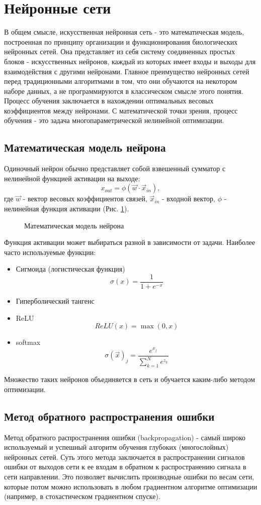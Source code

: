 \clearpage
\section{Нейронные сети}
	В общем смысле, искусственная нейронная сеть - это математическая модель, построенная по принципу организации и функционирования биологических нейронных сетей. Она представляет из себя систему соединенных простых блоков - искусственных нейронов, каждый из которых имеет входы и выходы для взаимодействия с другими нейронами. Главное преимущество нейронных сетей перед традиционными алгоритмами в том, что они обучаются на некотором наборе данных, а не программируются в классическом смысле этого понятия. Процесс обучения заключается в нахождении оптимальных весовых коэффициентов между нейронами. С математической точки зрения, процесс обучения - это задача многопараметрической нелинейной оптимизации.
	\subsection{Математическая модель нейрона}
		Одиночный нейрон обычно представляет собой взвешенный сумматор с нелинейной функцией активации на выходе:
		$$x_{out} = \phi(\vec{w} \cdotp \vec{x}_{in}),$$
		где $\vec{w}$ - вектор весовых коэффициентов связей, $\vec{x}_{in}$ - входной вектор, $\phi$ - нелинейная функция активации (Рис. \ref{3-artificial-neuron-model}).
		
		\begin{figure}[h]
			\caption{Математическая модель нейрона}
			\label{3-artificial-neuron-model}
		\end{figure}
		
		Функция активации может выбираться разной в зависимости от задачи. Наиболее часто используемые функции:
		
		\begin{itemize}
			\item Сигмоида (логистическая функция)
					$$\sigma(x) = \frac{1}{1 + e^{-x}}$$
			\item Гиперболический тангенс
			\item ReLU
					$$ReLU(x) = \max(0, x)$$
			\item softmax
					$$\sigma(\vec{x})_j = \frac{e^{x_j}}{\sum_{k=1}^{N} e^{z_k}}$$
		\end{itemize}
		Множество таких нейронов объединяется в сеть и обучается каким-либо методом оптимизации.
	\subsection{Метод обратного распространения ошибки}
		Метод обратного распространения ошибки (backpropagation) - самый широко используемый и успешный алгоритм обучения глубоких (многослойных) нейронных сетей. Суть этого метода заключается в распространении сигналов ошибки от выходов сети к ее входам в обратном к распространению сигнала в сети направлении. Это позволяет вычислить производные ошибки по весам сети, которые потом можно использовать в любом градиентном алгоритме оптимизации (например, в стохастическом градиентном спуске).
		
